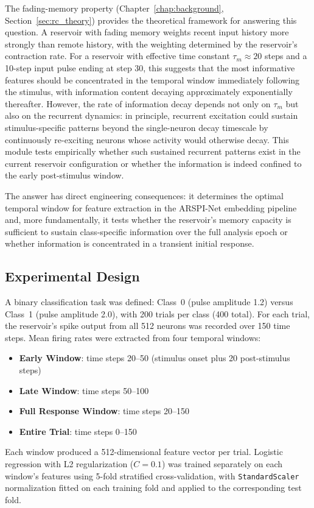 The fading-memory property (Chapter~\ref{chap:background}, Section~\ref{sec:rc_theory}) provides the theoretical framework for answering this question. A reservoir with fading memory weights recent input history more strongly than remote history, with the weighting determined by the reservoir's contraction rate. For a reservoir with effective time constant $\tau_m \approx 20$ steps and a 10-step input pulse ending at step 30, this suggests that the most informative features should be concentrated in the temporal window immediately following the stimulus, with information content decaying approximately exponentially thereafter. However, the rate of information decay depends not only on $\tau_m$ but also on the recurrent dynamics: in principle, recurrent excitation could sustain stimulus-specific patterns beyond the single-neuron decay timescale by continuously re-exciting neurons whose activity would otherwise decay. This module tests empirically whether such sustained recurrent patterns exist in the current reservoir configuration or whether the information is indeed confined to the early post-stimulus window.

The answer has direct engineering consequences: it determines the optimal temporal window for feature extraction in the ARSPI-Net embedding pipeline and, more fundamentally, it tests whether the reservoir's memory capacity is sufficient to sustain class-specific information over the full analysis epoch or whether information is concentrated in a transient initial response.

\subsection{Experimental Design}

A binary classification task was defined: Class~0 (pulse amplitude 1.2) versus Class~1 (pulse amplitude 2.0), with 200 trials per class (400 total). For each trial, the reservoir's spike output from all 512 neurons was recorded over 150 time steps. Mean firing rates were extracted from four temporal windows:
\begin{itemize}
    \item \textbf{Early Window}: time steps 20--50 (stimulus onset plus 20 post-stimulus steps)
    \item \textbf{Late Window}: time steps 50--100
    \item \textbf{Full Response Window}: time steps 20--150
    \item \textbf{Entire Trial}: time steps 0--150
\end{itemize}
Each window produced a 512-dimensional feature vector per trial. Logistic regression with L2 regularization ($C = 0.1$) was trained separately on each window's features using 5-fold stratified cross-validation, with \texttt{StandardScaler} normalization fitted on each training fold and applied to the corresponding test fold.


